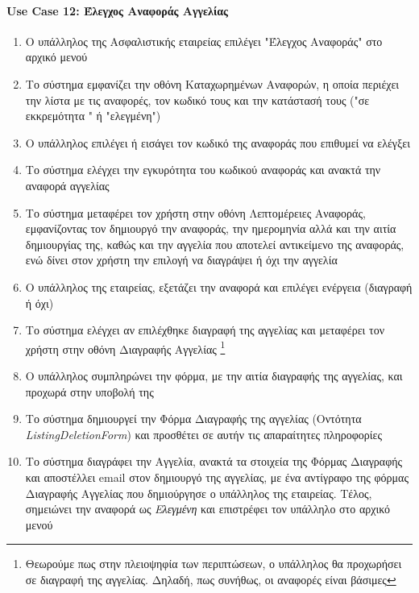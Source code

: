 \documentclass{../ol-softwaremanual}
\begin{document}
	\newpage
	\centering
	
	\paragraph{\en Use Case 12: \gr Έλεγχος Αναφοράς Αγγελίας} 
	
	\begin{enumerate}
		\item Ο υπάλληλος της Ασφαλιστικής εταιρείας επιλέγει \en"\gr Έλεγχος Αναφοράς\en" \gr στο αρχικό μενού
		\item Το σύστημα εμφανίζει την οθόνη Καταχωρημένων Αναφορών, η οποία περιέχει την λίστα με τις αναφορές, τον κωδικό τους και την κατάστασή τους (\en"\gr σε εκκρεμότητα \en" \gr ή \en"\gr ελεγμένη\en"\gr)
		\item Ο υπάλληλος επιλέγει ή εισάγει τον κωδικό της αναφοράς που επιθυμεί να ελέγξει 
		\item Το σύστημα ελέγχει την εγκυρότητα του κωδικού αναφοράς και ανακτά την αναφορά αγγελίας
		\item Το σύστημα μεταφέρει τον χρήστη στην οθόνη Λεπτομέρειες Αναφοράς, εμφανίζοντας τον δημιουργό την αναφοράς, την ημερομηνία αλλά και την αιτία δημιουργίας της, καθώς και την αγγελία που αποτελεί αντικείμενο της αναφοράς, ενώ δίνει στον χρήστη την επιλογή να διαγράψει ή όχι την αγγελία
		\item Ο υπάλληλος της εταιρείας, εξετάζει την αναφορά και επιλέγει ενέργεια (διαγραφή ή όχι)
		\item Το σύστημα ελέγχει αν επιλέχθηκε διαγραφή της αγγελίας και μεταφέρει τον χρήστη στην οθόνη Διαγραφής Αγγελίας \footnote[5]{Θεωρούμε πως στην πλειοψηφία των περιπτώσεων, ο υπάλληλος θα προχωρήσει σε διαγραφή της αγγελίας. Δηλαδή, πως συνήθως, οι αναφορές είναι βάσιμες}
		\item Ο υπάλληλος συμπληρώνει την φόρμα, με την αιτία διαγραφής της αγγελίας, και προχωρά στην υποβολή της
		\item Το σύστημα δημιουργεί την Φόρμα Διαγραφής της αγγελίας (Οντότητα \en \textit{ListingDeletionForm}\gr) και προσθέτει σε αυτήν τις απαραίτητες πληροφορίες
		\item Το σύστημα διαγράφει την Αγγελία, ανακτά τα στοιχεία της Φόρμας Διαγραφής και αποστέλλει \en email \gr στον δημιουργό της αγγελίας, με ένα αντίγραφο της φόρμας Διαγραφής Αγγελίας που δημιούργησε ο υπάλληλος της εταιρείας. Τέλος, σημειώνει την αναφορά ως \textit{Ελεγμένη} και επιστρέφει τον υπάλληλο στο αρχικό μενού
	\end{enumerate}
	
\end{document}
